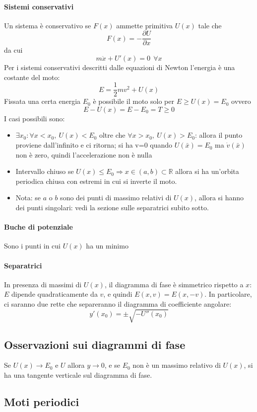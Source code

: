 \documentclass[a4paper,12pt]{article}
\begin{document}
\paragraph{Sistemi conservativi}
Un sistema è conservativo se $F(x)$ ammette primitiva $U(x)$ tale che $$F(x) = -\dfrac{\partial U}{\partial x}$$ da cui $$m\ddot{x} + U'(x) = 0 \ \ \forall x$$
Per i sistemi conservativi descritti dalle equazioni di Newton l'energia è una costante del moto:
$$ E = \dfrac{1}{2} mv^2+U(x)$$
Fissata una certa energia $E_0$ è possibile il moto solo per $E\geq U(x) = E_0$ ovvero $$E-U(x)=E-E_0 = T \geq 0$$
I casi possibili sono:
\begin{itemize}
	\item $\exists x_0: \forall x < x_0,\ U(x) < E_0$ oltre che $\forall x > x_0,\ U(x) > E_0$: allora il punto proviene dall'infinito e ci ritorna; si ha v=0 quando $U(\bar{x}) = E_0$ ma $\dot{v}(\bar{x})$ non è zero, quindi l'accelerazione non è nulla
	\item Intervallo chiuso se $U(x) \leq E_0 \Rightarrow x \in (a, b) \subset \mathbb{R}$ allora si ha un'orbita periodica chiusa con estremi in cui si inverte il moto.
	\item Nota: se $a$ o $b$ sono dei punti di massimo relativi di $U(x)$, allora si hanno dei punti singolari: vedi la sezione sulle separatrici subito sotto.
\end{itemize}
\paragraph{Buche di potenziale}
Sono i punti in cui $U(x)$ ha un minimo
\paragraph{Separatrici}
In presenza di massimi di $U(x)$, il diagramma di fase è simmetrico rispetto a $x$: $E$ dipende quadraticamente da $v$, e quindi $E(x, v) = E(x, -v)$.
In particolare, ci saranno due rette che separeranno il diagramma di coefficiente angolare:
$$y'(x_0) = \pm\sqrt{-U''(x_0)}$$

\subsection{Osservazioni sui diagrammi di fase}
Se $U(x) \to E_0$ e $U$ allora $y \to 0$, e se $E_0$ non è un massimo relativo di $U(x)$, si ha una tangente verticale sul diagramma di fase.


\subsection{Moti periodici}
\end{document}
